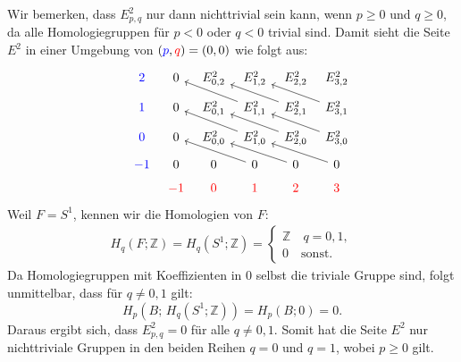 \documentclass[12pt]{article}
\numberwithin{conj}{section}
\begin{document}
    Wir bemerken, dass $E^{2}_{p,q}$ nur dann nichttrivial sein kann, wenn
    $p \geq 0$ und $q \geq 0$, da alle Homologiegruppen für $p < 0$ oder $q < 0$ trivial
    sind. Damit sieht die Seite $E^{2}$ in einer Umgebung von $({\color{blue}p},{\color{red}q}) = (0,0)$ wie
    folgt aus:
    \[
        \begin{tikzcd}
            [sep=tiny] {\color{blue}} & {\color{blue}2} & 0 & {E^2_{0,2}} & {E^2_{1,2}}
            & {E^2_{2,2}} & {E^2_{3,2}} \\ & {\color{blue}1} & 0 & {E^2_{0,1}} & {E^2_{1,1}}
            & {E^2_{2,1}} & {E^2_{3,1}} \\ & {\color{blue}0} & 0 & {E^2_{0,0}} & {E^2_{1,0}}
            & {E^2_{2,0}} & {E^2_{3,0}} \\ & {\color{blue}-1} & 0 & 0 & 0 & 0 & 0 \\ &
            {\color{red}} & {\color{red}-1} & {\color{red}0} & {\color{red}1} & {\color{red}2}
            & {\color{red}3} \arrow[from=2-5, to=1-3] \arrow[from=2-6, to=1-4] \arrow[from=2-7,
            to=1-5] \arrow[from=3-5, to=2-3] \arrow[from=3-6, to=2-4] \arrow[from=3-7,
            to=2-5] \arrow[from=4-5, to=3-3] \arrow[from=4-6, to=3-4] \arrow[from=4-7,
            to=3-5]
        \end{tikzcd}
    \]
    Weil $F = S^{1}$, kennen wir die Homologien von $F$:
    \begin{align}
        H_{q}(F;\mathbb{Z}) = H_{q}(S^{1};\mathbb{Z}) = \begin{cases}\mathbb{Z} \quad q = 0,1, \\ 0 \quad \text{sonst.}\end{cases}
    \end{align}
    Da Homologiegruppen mit Koeffizienten in $0$ selbst die triviale Gruppe sind, folgt
    unmittelbar, dass für $q \neq 0,1$ gilt:
    \[
        H_{p}(B;\, H_{q}(S^{1};\mathbb{Z}))  = H_{p}(B;0) = 0.
    \]
    Daraus ergibt sich, dass $E^{2}_{p,q}= 0$ für alle $q \neq 0,1$. Somit hat die
    Seite $E^{2}$ nur nichttriviale Gruppen in den beiden Reihen $q = 0$ und $q = 1$,
    wobei $p \geq 0$ gilt.
\end{document}
